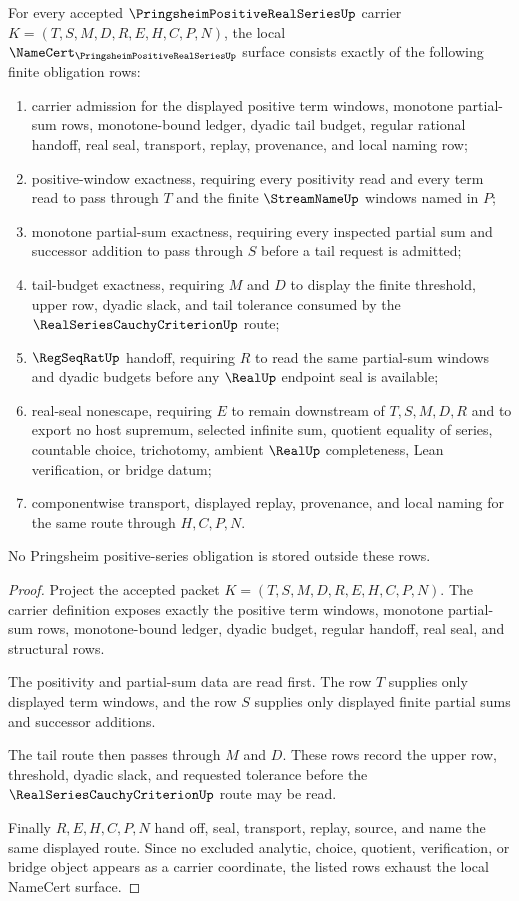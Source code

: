 \begin{theorem}
\label{thm:pringsheim-positive-real-series-namecert-obligations}
For every accepted $\PringsheimPositiveRealSeriesUp$ carrier $K=(T,S,M,D,R,E,H,C,P,N)$, the local $\NameCert_{\PringsheimPositiveRealSeriesUp}$ surface consists exactly of the following finite obligation rows:
\begin{enumerate}
\item carrier admission for the displayed positive term windows, monotone partial-sum rows, monotone-bound ledger, dyadic tail budget, regular rational handoff, real seal, transport, replay, provenance, and local naming row;
\item positive-window exactness, requiring every positivity read and every term read to pass through $T$ and the finite $\StreamNameUp$ windows named in $P$;
\item monotone partial-sum exactness, requiring every inspected partial sum and successor addition to pass through $S$ before a tail request is admitted;
\item tail-budget exactness, requiring $M$ and $D$ to display the finite threshold, upper row, dyadic slack, and tail tolerance consumed by the $\RealSeriesCauchyCriterionUp$ route;
\item $\RegSeqRatUp$ handoff, requiring $R$ to read the same partial-sum windows and dyadic budgets before any $\RealUp$ endpoint seal is available;
\item real-seal nonescape, requiring $E$ to remain downstream of $T,S,M,D,R$ and to export no host supremum, selected infinite sum, quotient equality of series, countable choice, trichotomy, ambient $\RealUp$ completeness, Lean verification, or bridge datum;
\item componentwise transport, displayed replay, provenance, and local naming for the same route through $H,C,P,N$.
\end{enumerate}
No Pringsheim positive-series obligation is stored outside these rows.
\end{theorem}
\begin{proof}
Project the accepted packet $K=(T,S,M,D,R,E,H,C,P,N)$. The carrier definition exposes exactly the positive term windows, monotone partial-sum rows, monotone-bound ledger, dyadic budget, regular handoff, real seal, and structural rows.

The positivity and partial-sum data are read first. The row $T$ supplies only displayed term windows, and the row $S$ supplies only displayed finite partial sums and successor additions.

The tail route then passes through $M$ and $D$. These rows record the upper row, threshold, dyadic slack, and requested tolerance before the $\RealSeriesCauchyCriterionUp$ route may be read.

Finally $R,E,H,C,P,N$ hand off, seal, transport, replay, source, and name the same displayed route. Since no excluded analytic, choice, quotient, verification, or bridge object appears as a carrier coordinate, the listed rows exhaust the local NameCert surface.
\end{proof}

